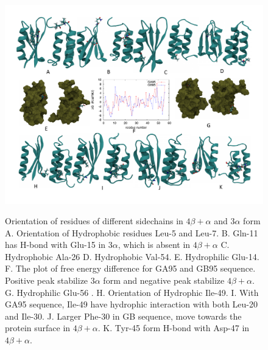 \documentclass[12pt]{article}
\begin{document}
\begin{figure}
\includegraphics[width=6.5 in,height=5.4 in]{orban_full.pdf}
\label{fig:orban_full}
\caption{Orientation of residues of different sidechains in $4 \beta + \alpha$ and $3 \alpha$ form
A. Orientation of Hydrophobic residues Leu-5 and Leu-7.
B. Gln-11 has H-bond with Glu-15 in $3 \alpha$, which is absent in $4 \beta + \alpha$
C. Hydrophobic Ala-26
D. Hydrophobic Val-54.
E. Hydrophilic Glu-14.
F. The plot of free energy difference for GA95 and GB95 sequence. Positive peak stabilize $3 \alpha$ form and negative peak 
stabilize $4 \beta + \alpha$. 
G. Hydrophilic Glu-56 .
H. Orientation of Hydrophic Ile-49.
I. With GA95 sequence, Ile-49 have hydrophic interaction with both Leu-20 and Ile-30.
J. Larger Phe-30 in GB sequence, move towards the protein surface in $4 \beta + \alpha$.
K. Tyr-45 form H-bond with Asp-47 in $4 \beta + \alpha$.}  
\end{figure}
\end{document}
